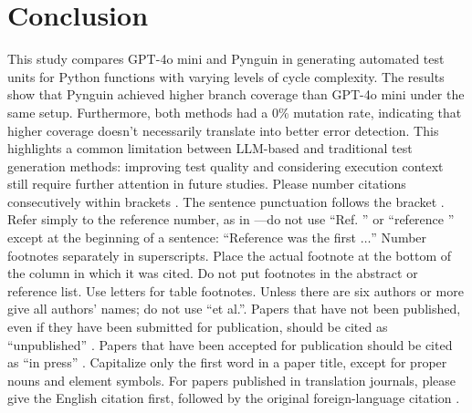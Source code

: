 \documentclass[conference]{IEEEtran}
\begin{document}
\section{Conclusion}
This study compares GPT-4o mini and Pynguin in generating automated test units for Python functions with varying levels of cycle complexity. The results show that Pynguin achieved higher branch coverage than GPT-4o mini under the same setup. Furthermore, both methods had a 0\% mutation rate, indicating that higher coverage doesn't necessarily translate into better error detection. This highlights a common limitation between LLM-based and traditional test generation methods: improving test quality and considering execution context still require further attention in future studies.
Please number citations consecutively within brackets \cite{b1}. The
sentence punctuation follows the bracket \cite{b2}. Refer simply to the reference
number, as in \cite{b3}---do not use ``Ref. \cite{b3}'' or ``reference \cite{b3}'' except at
the beginning of a sentence: ``Reference \cite{b3} was the first $\ldots$''
Number footnotes separately in superscripts. Place the actual footnote at
the bottom of the column in which it was cited. Do not put footnotes in the
abstract or reference list. Use letters for table footnotes.
Unless there are six authors or more give all authors' names; do not use
``et al.''. Papers that have not been published, even if they have been
submitted for publication, should be cited as ``unpublished'' \cite{b4}. Papers
that have been accepted for publication should be cited as ``in press'' \cite{b5}.
Capitalize only the first word in a paper title, except for proper nouns and
element symbols.
For papers published in translation journals, please give the English
citation first, followed by the original foreign-language citation \cite{b6}.
\end{document}
